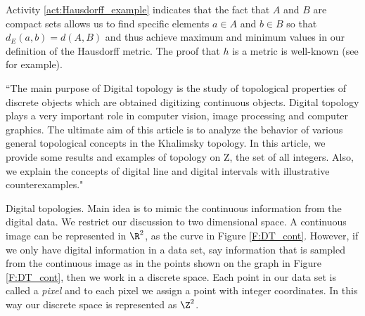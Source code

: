 Activity \ref{act:Hausdorff_example} indicates that the fact that $A$ and $B$ are compact sets allows us to find specific elements $a \in A$ and $b \in B$ so that $d_E(a,b) = d(A,B)$ and thus achieve maximum and minimum values in our definition of the Hausdorff metric. The proof that $h$ is a metric is well-known (see \cite{Barnsley, Edgar} for example). 

\begin{comment}
The only property that requires significant work is the triangle inequality. 

To prove the triangle inequality, let $A,B,C$ be compact subsets of a metric space $(X,d)$. We know that either $h(A,C) = d(A,C)$ or $h(A,C) = d(C,A)$. Without loss of generality, assume $h(A,C) = d(A,C)$. Choose $a \in A$ such that $d(a,C) = d(A,C) = h(A,C)$. Now choose $c \in C$ such that $d_E(a,c) = d(a,C) = h(A,C)$.  

Let $b_a \in B$ and $c_a \in C$ such that $d_E(a,b_a) = d(a,B)$ and $d_E(b_a, c_a) = d(b_a,C)$. Since $d_E(a,c) = \min_{c' \in C} \{d_E(a,c')\}$, we know $d_E(a,c) \leq d_E(a,c_a)$. The triangle inequality for the Euclidean metric gives us 
\[h(A,C) = d(A,C) = d_E(a,c) \leq d_E(a,c_a) \leq d_E(a,b_a) + d_E(b_a,c_a) = d(a,B) + d(b_a,C).\]
Since $d(a,B) \leq d(A,B)$ and $d(b_a,C) \leq d(B,C)$, we have 
\[h(A,C) \leq d(A,B) + d(B,C) \leq h(A,B) + h(A,C).\] 
\end{comment}


\label{sec_digital_line}

``The main purpose of Digital topology is the study of topological properties of discrete
objects which are obtained digitizing continuous objects. Digital topology plays a very
important role in computer vision, image processing and computer graphics. The ultimate
aim of this article is to analyze the behavior of various general topological concepts in the
Khalimsky topology. In this article, we provide some results and examples of topology on
Z, the set of all integers. Also, we explain the concepts of digital line and digital intervals
with illustrative counterexamples."

Digital topologies. Main idea is to mimic the continuous information from the digital data. We restrict our discussion to two dimensional space. A continuous image can be represented in $\R^2$, as the curve in Figure \ref{F:DT_cont}. However, if we only have digital information in a data set, say information that is sampled from the continuous image as in the points shown on the graph in Figure \ref{F:DT_cont}, then we work in a discrete space. Each point in our data set is called a \emph{pixel} and to each pixel we assign a point with integer coordinates. In this way our discrete space is represented as $\Z^2$. 

